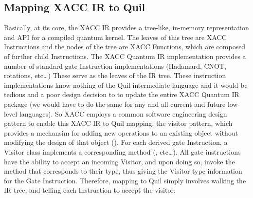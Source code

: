 \documentclass[letterpaper,10pt,english]{sphinxmanual}
\begin{document}
\subsection{Mapping XACC IR to Quil}
\label{\detokenize{plugins:mapping-xacc-ir-to-quil}}
Basically,
at its core, the XACC IR provides a tree-like, in-memory representation and API for a
compiled quantum kernel. The leaves of this tree are XACC Instructions and the nodes
of the tree are XACC Functions, which are composed of further child Instructions. The
XACC Quantum IR implementation provides a number of standard gate Instruction implementations
(Hadamard, CNOT, rotations, etc…) These serve as the leaves of the IR tree. These
instruction implementations know nothing of the Quil intermediate language and it would be tedious
and a poor design decision to to update the entire XACC Quantum IR package (we would have to do the
same for any and all current and future low-level languages). So XACC employs a common
software engineering design pattern to enable this XACC IR to Quil mapping: the
visitor pattern, which provides a mechansim for adding new operations to an
existing object without modifying the design of that object (). For each derived gate Instruction, a Visitor class implements a
corresponding  method (, etc…). All gate instructions have the
ability to accept an incoming Visitor, and upon doing so, invoke the  method that
corresponds to their type, thus giving the Visitor type information for the Gate Instruction.
Therefore, mapping to Quil simply involves walking the IR tree, and telling each Instruction to
accept the visitor:

\begin{sphinxVerbatim}[commandchars=\\\{\}]
   
 
  
          
      
     
   
\end{sphinxVerbatim}
\end{document}
